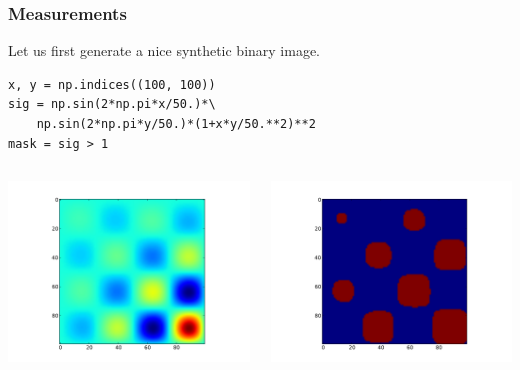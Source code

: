 \documentclass[10pt,colorlinks]{beamer}
\begin{document}
\begin{frame}[fragile]\frametitle{Measurements}

Let us first generate a nice synthetic binary image.
\begin{verbatim}
x, y = np.indices((100, 100))
sig = np.sin(2*np.pi*x/50.)*\
    np.sin(2*np.pi*y/50.)*(1+x*y/50.**2)**2
mask = sig > 1
\end{verbatim}

\begin{columns}[c]
\includegraphics[width=\textwidth]{plwfigis/CursP_3_figure69}

\includegraphics[width=\textwidth]{plwfigis/CursP_3_figure70}

\end{columns}
\end{frame}
\end{document}
